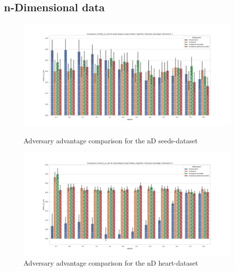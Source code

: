 \subsection{n-Dimensional data}
\begin{figure}[H]
    \centering
    \begin{minipage}[c]{0.8\textwidth}
        \includegraphics[width=1\textwidth]{Results/RQ2-nd/seeds-dataset/shokri_mi_adv_seeds-dataset_comparison.png}
        \caption{Adversary advantage comparison for the nD seeds-dataset}
        \label{fig:appendix-mi_seeds-dataset_comparison_nd}
    \end{minipage}
    \begin{minipage}[c]{0.8\textwidth}
        \includegraphics[width=1\textwidth]{Results/RQ2-nd/heart-dataset/shokri_mi_adv_heart-dataset_comparison.png}
        \caption{Adversary advantage comparison for the nD heart-dataset}
        \label{fig:appendix-mi_heart-dataset_comparison_nd}
    \end{minipage}

\end{figure}
